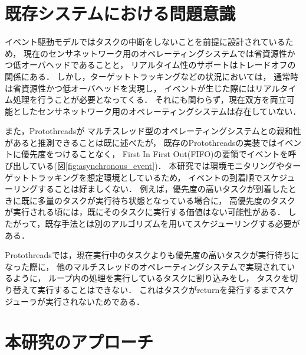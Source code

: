 


\section{既存システムにおける問題意識}
イベント駆動モデルではタスクの中断をしないことを前提に設計されているため，
現在のセンサネットワーク用のオペレーティングシステムでは省資源性かつ低オーバヘッドであることと，
リアルタイム性のサポートはトレードオフの関係にある．
しかし，ターゲットトラッキングなどの状況においては，
通常時は省資源性かつ低オーバヘッドを実現し，
イベントが生じた際にはリアルタイム処理を行うことが必要となってくる．
それにも関わらず，現在双方を両立可能としたセンサネットワーク用のオペレーティングシステムは存在していない．

また，Protothreadsが
マルチスレッド型のオペレーティングシステムとの親和性があると推測できることは既に述べたが，
既存のProtothreadsの実装ではイベントに優先度をつけることなく，
First In First Out(FIFO)の要領でイベントを呼び出している(図\ref{fig:asynchronous_event})．
本研究では環境モニタリングやターゲットトラッキングを想定環境としているため，
イベントの到着順でスケジューリングすることは好ましくない．
例えば，優先度の高いタスクが到着したときに既に多量のタスクが実行待ち状態となっている場合に，
高優先度のタスクが実行される頃には，既にそのタスクに実行する価値はない可能性がある．
したがって，既存手法とは別のアルゴリズムを用いてスケジューリングする必要がある．



Protothreadsでは，現在実行中のタスクよりも優先度の高いタスクが実行待ちになった際に，
他のマルチスレッドのオペレーティングシステムで実現されているように，
ループ内の処理を実行しているタスクに割り込みをし，
タスクを切り替えて実行することはできない．
これはタスクがreturnを発行するまでスケジューラが実行されないためである．


\section{本研究のアプローチ}


